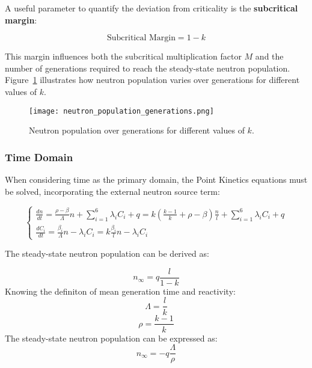 A useful parameter to quantify the deviation from criticality is the \textbf{subcritical margin}:

\begin{equation}
\text{Subcritical Margin} = 1 - k
\end{equation}

This margin influences both the subcritical multiplication factor $M$ and the number of generations required to reach the steady-state neutron population. Figure~\ref{fig:n_vs_gen} illustrates how neutron population varies over generations for different values of \( k \).

\begin{figure}[H]
    \centering
    \texttt{[image: neutron\_population\_generations.png]} %
    \caption{Neutron population over generations for different values of $ k $.}
    \label{fig:n_vs_gen}
\end{figure}

\subsubsection{Time Domain}

When considering time as the primary domain, the Point Kinetics equations must be solved, incorporating the external neutron source term:

\begin{equation}
    \begin{cases}
        \frac{dn}{dt} = \frac{\rho - \beta}{\Lambda} n + \sum\limits_{i=1}^{6} \lambda_i C_i + q 
        = k \left( \frac{k-1}{k} + \rho - \beta \right) \frac{n}{l} + \sum\limits_{i=1}^{6} \lambda_i C_i + q \\[10pt]
        
        \frac{dC_i}{dt} = \frac{\beta_i}{\Lambda} n - \lambda_i C_i 
        = k \frac{\beta_i}{l} n - \lambda_i C_i
    \end{cases}
\end{equation}
    
The steady-state neutron population can be derived as:

\begin{equation}
    n_{\infty} = q \frac{l}{1 - k}
\end{equation}
Knowing the definiton of mean generation time and reactivity:
\begin{equation}
    \Lambda =\frac{l}{k}
\end{equation}
\hspace{1cm}
\begin{equation}
    \rho = \frac{k-1}{k}
\end{equation}
The steady-state neutron population can be expressed as:
\begin{equation}
    n_{\infty} = - q\frac{\Lambda}{\rho}
\end{equation}

